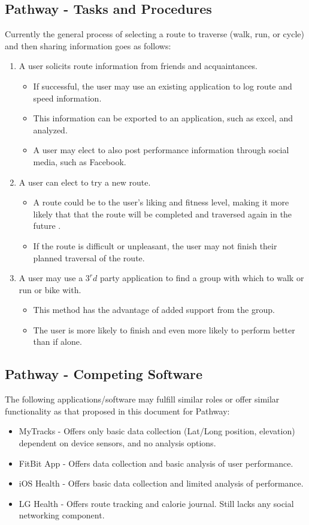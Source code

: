 ﻿\documentclass{article}
\begin{document}
\subsection{Pathway - Tasks and Procedures}
Currently the general process of selecting a route to traverse (walk, run, or cycle) and then sharing information goes as follows:
\begin{enumerate}
    \item A user solicits route information from friends and acquaintances.
        \begin{itemize}
            \item If successful, the user may use an existing application to log route and speed information.
            \item This information can be exported to an application, such as excel, and analyzed.
            \item A user may elect to also post performance information through social media, such as Facebook.
        \end{itemize}
    \item A user can elect to try a new route.
        \begin{itemize}
            \item A route could be to the user's liking and fitness level, making it more likely that that the route will be completed and traversed again in the future .
            \item If the route is difficult or unpleasant, the user may not finish their planned traversal of the route.
        \end{itemize}
    \item A user may use a $3^rd$ party application to find a group with which to walk or run or bike with.
        \begin{itemize}
            \item This method has the advantage of added support from the group.
            \item The user is more likely to finish and even more likely to perform better than if alone.
        \end{itemize}
\end{enumerate}

\subsection{Pathway - Competing Software}
The following applications/software may fulfill similar roles or offer similar functionality as that proposed in this document for Pathway:
\begin{itemize}
    \item MyTracks - Offers only basic data collection (Lat/Long position, elevation) dependent on device sensors, and no analysis options.
    \item FitBit App - Offers data collection and basic analysis of user performance.
    \item iOS Health - Offers basic data collection and limited analysis of performance.
    \item LG Health - Offers route tracking and calorie journal. Still lacks any social networking component.
\end{itemize}
\end{document}

